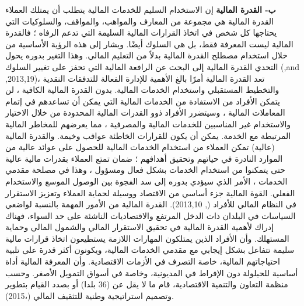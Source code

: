 \documentclass[10pt,a4paper]{report}
\begin{document}
\begin{doublespacing}
\textbf{ب‌- القدرة المالية}  
إن الاستخدام السليم للخدمات المالية يتطلب أن يمتلك العملاء القدرة المالية هي مجموعة من المعارف والمواهب، والمواقف، والسلوكيات التي يحتاجها كل شخص في اتخاذ القرارات المالية السليمة التي تدعم الرفاه ؛ فالقدرة المالية ليست المعرفة فقط، بل هي السلوك أيضًا. ويشار إلى هذه الرؤية الأساسية من خلال استخدام مصطلح القدرة المالية بدلاً من التعليم المالي.  وهذا التغير بدوره يحول التحدي القدرة المالية إلى البحث عن الرافعة المالية التي تحفز على تغيير السلوك (,and  ,2013,19)، تعد القدرة المالية أمرًا بالغ الأهمية للإدارة الفعالة للتدفقات النقدية والتخطيط المستقبلي واستخدام الخدمات المالية. بدون القدرة المالية الكافية ، لن يتمكن الأفراد من الاستفادة من الخدمات المالية التي يمكن أن تساعدهم في إتمام المعاملات المالية ، وسيتضرر الأفراد ذوو القدرات المالية المحدودة من خلال الاختيار والاستخدام غير المناسبين للخدمات المالية والمصرفية ، مما يعرضهم للمخاطر المالية المرتبطة مع الخدمة. يمكن أن يكون للقرارات الخاطئة عواقب وخيمة. والقدرة المالية (عالية) تمكن العملاء من استخدام الخدمات المالية للحصول على عوائد عالية من الموارد النادرة في حياتهم وتحقيق أهدافهم ؛ ضمان تمتع العملاء بقدرات مالية عالية حتى يتمكنوا من استخدام الخدمات بشكل فعال ومسؤول ، وهذا في مصلحة مقدمي الخدمات ، الأمر الذي سيؤدي بدوره إلى سد الفجوة بين الوصول الموسع والاستخدام الفعلي. القوة المالية جزء أساسي من الاقتصاد ووسيلة لحماية العملاء وتعزيز الاستقرار في النظام المالي للأفراد (, 2013,10).   
القدرة المالية من الأمور المهمة بالنسبة لواضعي السياسات في البلدان ذات الدخل المرتفع والاقتصاديات الناشئة على حد السواء، فهناك إدراك لأهمية القدرة المالية في تحقيق الاستقرار المالي والشمول المالي وحماية المستهلك. وأن الأفراد الذين يمتلكون المهارات اللازمة يستطيعون اتخاذ قرارات مالية سليمة تتفاعل بشكل إيجابي مع مقدمي الخدمات المالية، ويكونون أكثر قدرة على تلبية احتياجاتهم المالية، خاصة التصرف في الأزمات الاقتصادية. وأن المعرفة المالية أداة أساسية للحيلولة دون الإفراط في المديونية، وخاصة في أسواق التمويل الأصغر. وحسب منظمة التعاون والتنمية الاقتصادية، قام ما لا يقل عن (36 بلدا) أو بصدد القيام بتطوير وتصميم استراتيجية وطنية للتثقيف المالي (،2015).

\end{doublespacing}
\end{document}
